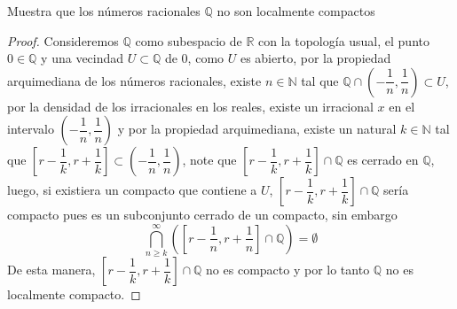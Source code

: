 
\item Muestra que los números racionales $\mathbb{Q}$ no son localmente compactos
\begin{proof}   
Consideremos $\mathbb{Q}$ como subespacio de $\mathbb{R}$ con la topología usual, el punto $0\in \mathbb{Q}$ y una vecindad $U \subset \mathbb{Q}$ de 0, como $U$ es abierto, por la propiedad arquimediana de los números racionales, existe $n \in \mathbb{N}$ tal que $ \mathbb{Q} \cap \left(-\dfrac{1}{n},\dfrac{1}{n}\right) \subset U$, por la densidad de los irracionales en los reales, existe un irracional $x$ en el intervalo $\left(-\dfrac{1}{n},\dfrac{1}{n}\right)$ y por la propiedad arquimediana, existe un natural $k \in \mathbb{N}$ tal que $\left[r-\dfrac{1}{k},r+\dfrac{1}{k}\right] \subset \left(-\dfrac{1}{n},\dfrac{1}{n}\right)$, note que $\left[r-\dfrac{1}{k},r+\dfrac{1}{k}\right]\cap \mathbb{Q}$ es cerrado en $\mathbb{Q}$, luego, si existiera un compacto que contiene a $U$, $\left[r-\dfrac{1}{k},r+\dfrac{1}{k}\right]\cap \mathbb{Q}$ sería compacto pues es un subconjunto cerrado de un compacto, sin embargo
\[
    \bigcap_{n \geq k}^{\infty}\left(\left[r-\frac{1}{n},r+\frac{1}{n}\right]\cap \mathbb{Q}\right) = \emptyset
\]
De esta manera, $\left[r-\dfrac{1}{k},r+\dfrac{1}{k}\right]\cap \mathbb{Q}$ no es compacto y por lo tanto $\mathbb{Q}$ no es localmente compacto.
            
\end{proof}